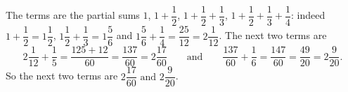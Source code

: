The terms are the partial sums $1$, $1+\dfrac{1}{2}$, $1+\dfrac{1}{2}+\dfrac{1}{3}$, $1+\dfrac{1}{2}+\dfrac{1}{3}+\dfrac{1}{4}$: indeed $1+\dfrac{1}{2}=1\dfrac{1}{2}$, $1\dfrac{1}{2}+\dfrac{1}{3}=1\dfrac{5}{6}$ and $1\dfrac{5}{6}+\dfrac{1}{4}=\dfrac{25}{12}=2\dfrac{1}{12}$. The next two terms are
\[
2\dfrac{1}{12}+\dfrac{1}{5}=\dfrac{125+12}{60}=\dfrac{137}{60}=2\dfrac{17}{60}\qquad\text{and}\qquad\dfrac{137}{60}+\dfrac{1}{6}=\dfrac{147}{60}=\dfrac{49}{20}=2\dfrac{9}{20}.
\]
So the next two terms are $\boxed{2\dfrac{17}{60}\text{ and }2\dfrac{9}{20}}$.
